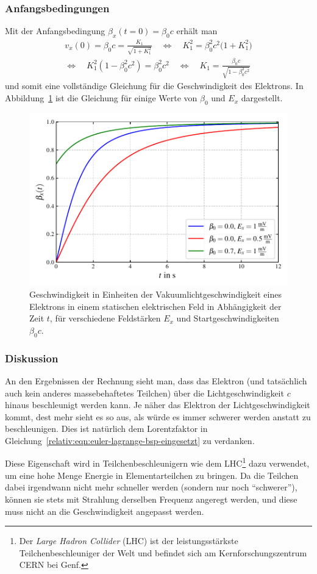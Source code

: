 \subsubsection{Anfangsbedingungen}
Mit der Anfangsbedingung \(\beta_x(t=0)=\beta_0 c\) erhält man
\begin{multline*}
    v_x(0) = \beta_0 c = \frac{K_1}{\sqrt{1+K_1^2}}\quad
    \Leftrightarrow\quad K_1^2 = \beta_0^2 c^2 \bigl(1+K_1^2\bigr)\\
    \Leftrightarrow\quad K_1^2 (1-\beta_0^2 c^2) = \beta_0^2 c^2\quad
    \Leftrightarrow\quad K_1 = \frac{\beta_0 c}{\sqrt{1-\beta_0^2 c^2}}
\end{multline*}
und somit eine vollständige Gleichung für die Geschwindigkeit des Elektrons.
In Abbildung~\ref{relativ:fig:elektron-em-feld} ist die Gleichung für einige
Werte von \(\beta_0\) und \(E_x\) dargestellt.
\begin{figure}
    \centering
    \includegraphics[width=0.8\linewidth]{papers/relativ/images/elektron_e-feld.pdf}
    \caption{Geschwindigkeit in Einheiten der Vakuumlichtgeschwindigkeit
    eines Elektrons in einem statischen elektrischen Feld in Abhängigkeit der Zeit \(t\),
    für verschiedene Feldstärken \(E_x\) und Startgeschwindigkeiten \(\beta_0 c\).
    \label{relativ:fig:elektron-em-feld}}
\end{figure}

\subsubsection{Diskussion}
An den Ergebnissen der Rechnung sieht man, dass das Elektron (und tatsächlich auch kein anderes
massebehaftetes Teilchen) über die Lichtgeschwindigkeit \(c\) hinaus beschleunigt werden kann.
Je näher das Elektron der Lichtgeschwindigkeit kommt, dest mehr sieht es so aus,
als würde es immer schwerer werden anstatt zu beschleunigen.
Dies ist natürlich dem Lorentzfaktor in Gleichung~\eqref{relativ:eqn:euler-lagrange-bsp-eingesetzt}
zu verdanken.

Diese Eigenschaft wird in Teilchenbeschleunigern wie dem LHC\footnote{
Der \emph{Large Hadron Collider} (LHC) ist der leistungsstärkste
Teilchenbeschleuniger der Welt und befindet sich am
Kernforschungszentrum CERN bei Genf.
}
dazu verwendet, um eine hohe Menge Energie in Elementarteilchen zu bringen.
Da die Teilchen dabei irgendwann nicht mehr schneller werden
(sondern nur noch ``schwerer''),
können sie stets mit Strahlung derselben Frequenz angeregt werden, und
diese muss nicht an die Geschwindigkeit angepasst werden.
